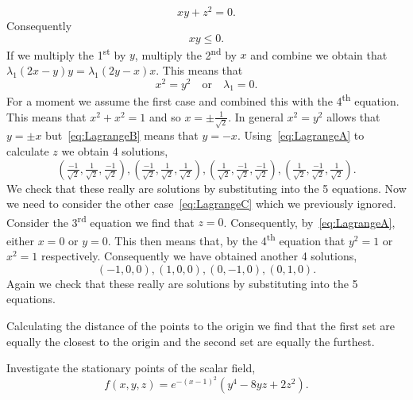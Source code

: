 \begin{solution}
\begin{equation}
        xy + z^2 = 0.
    \end{equation}
    Consequently
    \begin{equation}
        \label{eq:LagrangeB}
        xy \leq 0.
    \end{equation}
    If we multiply the 1\textsuperscript{st} by \(y\), multiply the 2\textsuperscript{nd} by \(x\) and combine we obtain that \(\lambda_1(2x-y)y = \lambda_1(2y - x)x\).
    This means that
    \begin{equation}
        \label{eq:LagrangeC}
        x^2 = y^2
        \quad \text{or} \quad
        \lambda_1 = 0.
    \end{equation}
    For a moment we assume the first case and combined this with the 4\textsuperscript{th} equation.
    This means that \(x^2 +x^2 = 1\) and so \(x = \pm \frac{1}{\sqrt{2}}\).
    In general \(x^2 = y^2\) allows that \(y = \pm x\) but~\eqref{eq:LagrangeB} means that \(y = -x\). Using~\eqref{eq:LagrangeA} to calculate \(z\) we obtain 4 solutions,
    \[
        (\tfrac{-1}{\sqrt{2}},\tfrac{1}{\sqrt{2}},\tfrac{-1}{\sqrt{2}}),
        (\tfrac{-1}{\sqrt{2}},\tfrac{1}{\sqrt{2}},\tfrac{1}{\sqrt{2}}),
        (\tfrac{1}{\sqrt{2}},\tfrac{-1}{\sqrt{2}},\tfrac{-1}{\sqrt{2}}),
        (\tfrac{1}{\sqrt{2}},\tfrac{-1}{\sqrt{2}},\tfrac{1}{\sqrt{2}}).
    \]
    We check that these really are solutions by substituting into the 5 equations.
    Now we need to consider the other case~\eqref{eq:LagrangeC} which we previously ignored.
    Consider the 3\textsuperscript{rd} equation we find that \(z = 0\).
    Consequently, by~\eqref{eq:LagrangeA}, either \(x=0\) or \(y=0\).
    This then means that, by the 4\textsuperscript{th} equation that \(y^2=1\) or \(x^2=1\) respectively.
    Consequently we have obtained another 4 solutions,
    \[
        (-1,0,0),
        (1,0,0),
        (0,-1,0),
        (0,1,0).
    \]
    Again we check that these really are solutions by substituting into the 5 equations.

    Calculating the distance of the points to the origin we find that the first set are equally the closest to the origin and the second set are equally the furthest.
\end{solution}



\begin{task}
    Investigate the stationary points of the scalar field,
    \[
        f(x,y,z) =  e^{-{(x-1)}^2}(y^4 - 8yz + 2z^2).
    \]
\end{task}

